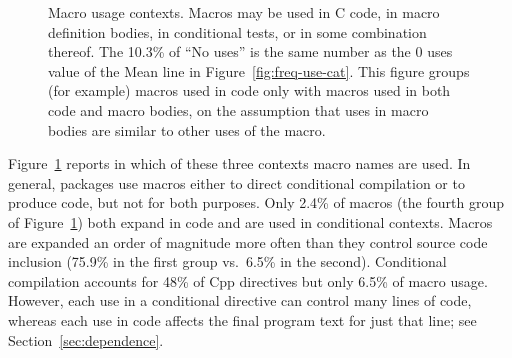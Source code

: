 \documentclass[10pt]{article}
\newcommand{\captionsmall}[1]{\caption[]{\small #1}}
\begin{document}
\begin{figure}
\centerline{\small \setlength{\tabcolsep}{.25em} }
\captionsmall{Macro usage contexts.  Macros may be used in C code, in
  macro definition bodies, in conditional tests, or in some combination
  thereof.  The 10.3\%
  of ``No uses'' is the same number as the 0 uses value of the Mean line in
  Figure~\ref{fig:freq-use-cat}.
  This figure groups (for example) macros used in code only with macros used
  in both code and macro bodies, on the assumption that uses in macro
  bodies are similar to other uses of the macro.}
\label{fig:where-used}
\end{figure}



Figure~\ref{fig:where-used} reports in which of these three contexts macro
names are used.  In general, packages use macros either to direct
conditional compilation or to produce code, but not for both purposes.
Only 2.4\% of macros (the fourth group of Figure~\ref{fig:where-used}) both
expand in code and are used in conditional contexts.  Macros are expanded
an order of magnitude more often than they control source code inclusion
(75.9\% in the first group vs.\ 6.5\% in the second).  Conditional
compilation accounts for 48\% of Cpp directives but only 6.5\% of macro
usage.  However, each use in a conditional directive can control many lines of
code, whereas each use in code affects the final program text for just that
line; see Section~\ref{sec:dependence}.



\end{document}
